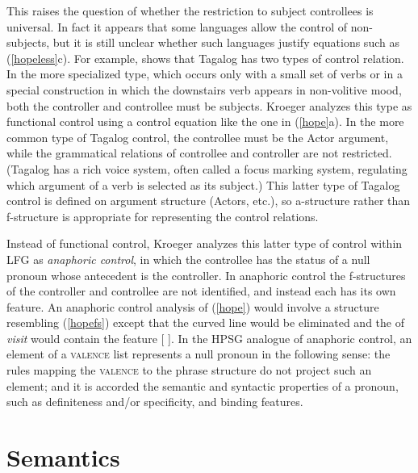 This raises the question of whether the restriction to subject controllees is universal.  In fact it appears that some languages allow the control of non-subjects, but it is still unclear whether such languages justify equations such as (\ref{hopeless}c).  For example,   \citet{kroeger:1993} shows that Tagalog has two types of control relation.  In the more specialized type, which occurs only with a small set of verbs or in a special construction in which the downstairs verb appears in non-volitive mood, both the controller and controllee must be subjects.  
Kroeger analyzes this type as functional control using a control equation like the one in (\ref{hope}a).  In the more common type of Tagalog control, the controllee must be the Actor argument, while the grammatical relations of controllee and controller are not restricted.  (Tagalog has a rich voice system, often called a focus marking system, regulating which argument of a verb is selected as its subject.)  
This latter type of Tagalog control is defined on argument structure (Actors, etc.), so a-structure rather than f-structure is appropriate for representing the control relations.    

Instead of functional control, Kroeger analyzes this latter type of control within LFG as \textit{anaphoric control}, in which the controllee has the status of a null pronoun whose antecedent is the controller.  In anaphoric control the f-structures of the controller and controllee are not identified, and instead each has its own  feature.  An anaphoric control analysis of (\ref{hope}) would involve a structure resembling (\ref{hopefs}) except that the curved line would be eliminated and the  of \textit{visit} would contain the feature [ ].  In the HPSG analogue of anaphoric control, an element of a \textsc{valence} list represents a null pronoun in the following sense:  the rules mapping the \textsc{valence} to the phrase structure do not project such an element; and it is accorded the semantic and syntactic properties of a pronoun, such as definiteness and/or specificity, and binding features.  


\section{Semantics}


